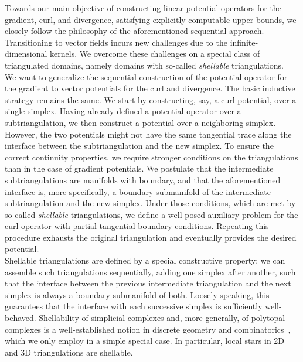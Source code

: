 \documentclass[10pt,a4paper]{article}
\begin{document}
Towards our main objective of constructing linear potential operators for the gradient, curl, and divergence, satisfying explicitly computable upper bounds, we closely follow the philosophy of the aforementioned sequential approach. Transitioning to vector fields incurs new challenges due to the infinite-dimensional kernels. We overcome these challenges on a special class of triangulated domains, namely domains with so-called \emph{shellable} triangulations. 
\\




We want to generalize the sequential construction of the potential operator for the gradient to vector potentials for the curl and divergence. The basic inductive strategy remains the same. We start by constructing, say, a curl potential, over a single simplex. Having already defined a potential operator over a subtriangulation, we then construct a potential over a neighboring simplex. However, the two potentials might not have the same tangential trace along the interface between the subtriangulation and the new simplex. 
% 
To ensure the correct continuity properties, we require stronger conditions on the triangulations than in the case of gradient potentials. We postulate that the intermediate subtriangulations are manifolds with boundary, and that the aforementioned interface is, more specifically, a boundary submanifold of the intermediate subtriangulation and the new simplex. Under those conditions, which are met by so-called \textit{shellable} triangulations, we define a well-posed auxiliary problem for the curl operator with partial tangential boundary conditions. Repeating this procedure exhausts the original triangulation and eventually provides the desired potential.
\\

Shellable triangulations are defined by a special constructive property:
we can assemble such triangulations sequentially, adding one simplex after another, such that the interface between the previous intermediate triangulation and the next simplex is always a boundary submanifold of both.
Loosely speaking, this guarantees that the interface with each successive simplex is sufficiently well-behaved.
Shellability of simplicial complexes and, more generally, of polytopal complexes is a well-established notion in discrete geometry and combinatorics~\cite{ziegler1995lectures}, which we only employ in a simple special case. 
In particular, local stars in 2D and 3D triangulations are shellable. 
\\
\end{document}
